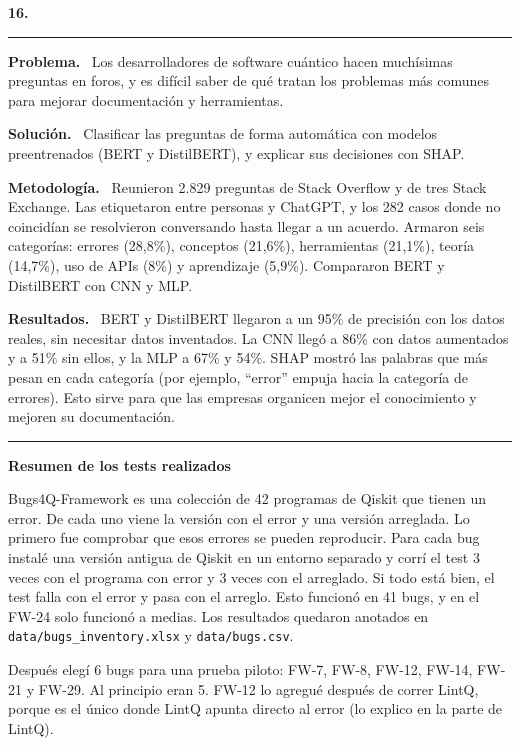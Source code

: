 \documentclass[11pt,a4paper]{article}
\newcommand{\paper}[1]{\vspace{1.2em}\par{\large\textbf{#1}}\par\vspace{0.2em}\hrule\vspace{0.4em}}
\newcommand{\parte}[1]{\par\textbf{#1.}\ }
\begin{document}
\paper{16.}

\parte{Problema}
Los desarrolladores de software cuántico hacen muchísimas preguntas en foros, y es difícil saber de qué tratan los problemas más comunes para mejorar documentación y herramientas.

\parte{Solución}
Clasificar las preguntas de forma automática con modelos preentrenados (BERT y DistilBERT), y explicar sus decisiones con SHAP.

\parte{Metodología}
Reunieron 2.829 preguntas de Stack Overflow y de tres Stack Exchange. Las etiquetaron entre personas y ChatGPT, y los 282 casos donde no coincidían se resolvieron conversando hasta llegar a un acuerdo. Armaron seis categorías: errores (28,8\%), conceptos (21,6\%), herramientas (21,1\%), teoría (14,7\%), uso de APIs (8\%) y aprendizaje (5,9\%). Compararon BERT y DistilBERT con CNN y MLP.

\parte{Resultados}
BERT y DistilBERT llegaron a un 95\% de precisión con los datos reales, sin necesitar datos inventados. La CNN llegó a 86\% con datos aumentados y a 51\% sin ellos, y la MLP a 67\% y 54\%. SHAP mostró las palabras que más pesan en cada categoría (por ejemplo, ``error'' empuja hacia la categoría de errores). Esto sirve para que las empresas organicen mejor el conocimiento y mejoren su documentación.


\vspace{1.5em}
\hrule
\vspace{1em}

{\large\textbf{Resumen de los tests realizados}}

\vspace{0.5em}
Bugs4Q-Framework es una colección de 42 programas de Qiskit que tienen un error. De cada uno viene la versión con el error y una versión arreglada. Lo primero fue comprobar que esos errores se pueden reproducir. Para cada bug instalé una versión antigua de Qiskit en un entorno separado y corrí el test 3 veces con el programa con error y 3 veces con el arreglado. Si todo está bien, el test falla con el error y pasa con el arreglo. Esto funcionó en 41 bugs, y en el FW-24 solo funcionó a medias. Los resultados quedaron anotados en \texttt{data/bugs\_inventory.xlsx} y \texttt{data/bugs.csv}.

Después elegí 6 bugs para una prueba piloto: FW-7, FW-8, FW-12, FW-14, FW-21 y FW-29. Al principio eran 5. FW-12 lo agregué después de correr LintQ, porque es el único donde LintQ apunta directo al error (lo explico en la parte de LintQ).
\end{document}
